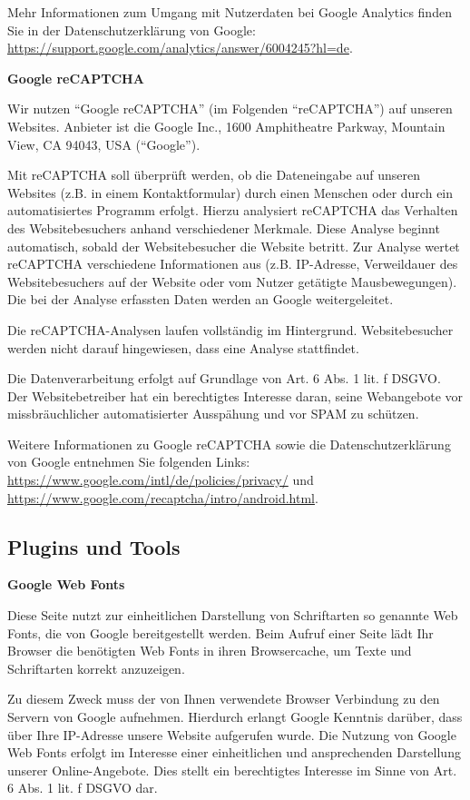 \documentclass[12pt,a4paper]{scrartcl}
\begin{document}
Mehr Informationen zum Umgang mit Nutzerdaten bei Google Analytics
finden Sie in der Datenschutzerklärung von Google:
\url{https://support.google.com/analytics/answer/6004245?hl=de}.

\textbf{Google reCAPTCHA}

Wir nutzen ``Google reCAPTCHA'' (im Folgenden ``reCAPTCHA'') auf unseren
Websites. Anbieter ist die Google Inc., 1600 Amphitheatre Parkway,
Mountain View, CA 94043, USA (``Google'').

Mit reCAPTCHA soll überprüft werden, ob die Dateneingabe auf unseren
Websites (z.B. in einem Kontaktformular) durch einen Menschen oder durch
ein automatisiertes Programm erfolgt. Hierzu analysiert reCAPTCHA das
Verhalten des Websitebesuchers anhand verschiedener Merkmale. Diese
Analyse beginnt automatisch, sobald der Websitebesucher die Website
betritt. Zur Analyse wertet reCAPTCHA verschiedene Informationen aus
(z.B. IP-Adresse, Verweildauer des Websitebesuchers auf der Website oder
vom Nutzer getätigte Mausbewegungen). Die bei der Analyse erfassten
Daten werden an Google weitergeleitet.

Die reCAPTCHA-Analysen laufen vollständig im Hintergrund.
Websitebesucher werden nicht darauf hingewiesen, dass eine Analyse
stattfindet.

Die Datenverarbeitung erfolgt auf Grundlage von Art. 6 Abs. 1 lit. f
DSGVO. Der Websitebetreiber hat ein berechtigtes Interesse daran, seine
Webangebote vor missbräuchlicher automatisierter Ausspähung und vor SPAM
zu schützen.

Weitere Informationen zu Google reCAPTCHA sowie die Datenschutzerklärung
von Google entnehmen Sie folgenden Links:
\url{https://www.google.com/intl/de/policies/privacy/} und
\url{https://www.google.com/recaptcha/intro/android.html}.

\hypertarget{plugins-und-tools}{%
\subsection{Plugins und Tools}\label{plugins-und-tools}}

\textbf{Google Web Fonts}

Diese Seite nutzt zur einheitlichen Darstellung von Schriftarten so
genannte Web Fonts, die von Google bereitgestellt werden. Beim Aufruf
einer Seite lädt Ihr Browser die benötigten Web Fonts in ihren
Browsercache, um Texte und Schriftarten korrekt anzuzeigen.

Zu diesem Zweck muss der von Ihnen verwendete Browser Verbindung zu den
Servern von Google aufnehmen. Hierdurch erlangt Google Kenntnis darüber,
dass über Ihre IP-Adresse unsere Website aufgerufen wurde. Die Nutzung
von Google Web Fonts erfolgt im Interesse einer einheitlichen und
ansprechenden Darstellung unserer Online-Angebote. Dies stellt ein
berechtigtes Interesse im Sinne von Art. 6 Abs. 1 lit. f DSGVO dar.
\end{document}
